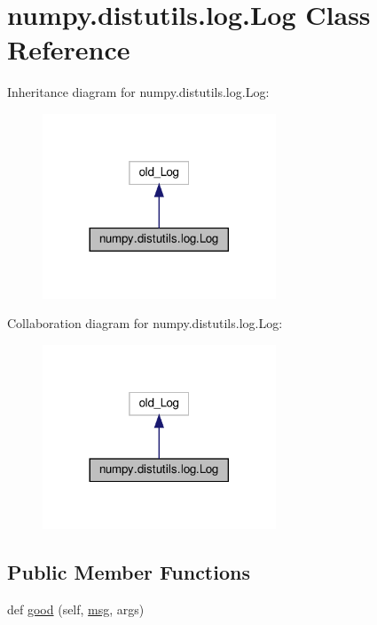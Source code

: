 \hypertarget{classnumpy_1_1distutils_1_1log_1_1Log}{}\section{numpy.\+distutils.\+log.\+Log Class Reference}
\label{classnumpy_1_1distutils_1_1log_1_1Log}


Inheritance diagram for numpy.\+distutils.\+log.\+Log\+:
\nopagebreak
\begin{figure}[H]
\begin{center}
\leavevmode
\includegraphics[width=197pt]{classnumpy_1_1distutils_1_1log_1_1Log__inherit__graph}
\end{center}
\end{figure}


Collaboration diagram for numpy.\+distutils.\+log.\+Log\+:
\nopagebreak
\begin{figure}[H]
\begin{center}
\leavevmode
\includegraphics[width=197pt]{classnumpy_1_1distutils_1_1log_1_1Log__coll__graph}
\end{center}
\end{figure}
\subsection*{Public Member Functions}
\begin{DoxyCompactItemize}
\item 
def \hyperlink{classnumpy_1_1distutils_1_1log_1_1Log_a39c95fb73840af463ef90108b254b9fa}{good} (self, \hyperlink{namespacenumpy_ab96122eb8e44294b488b0ef93ec27d38}{msg}, args)
\end{DoxyCompactItemize}


